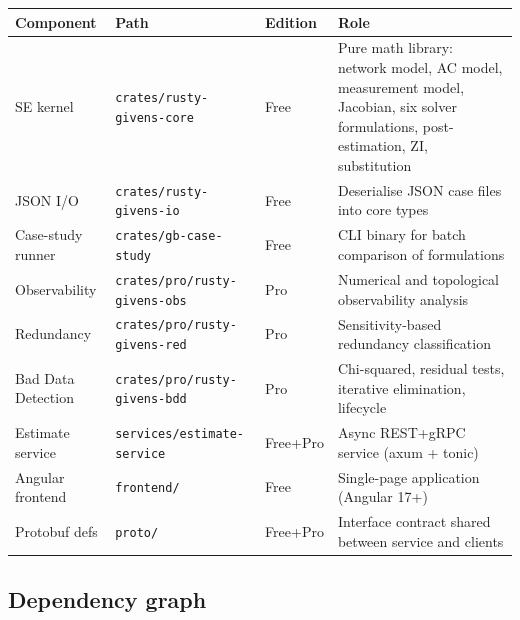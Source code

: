 \documentclass[11pt,a4paper]{article}
\begin{document}
\begin{center}
\small
\begin{tabular}{lllp{48mm}}
  \toprule
  \textbf{Component} & \textbf{Path} & \textbf{Edition} & \textbf{Role} \\
  \midrule
  SE kernel          & \texttt{crates/rusty-givens-core} & Free
    & Pure math library: network model, AC model, measurement model,
      Jacobian, six solver formulations, post-estimation, ZI, substitution \\
  JSON I/O           & \texttt{crates/rusty-givens-io}   & Free
    & Deserialise JSON case files into core types \\
  Case-study runner  & \texttt{crates/gb-case-study}     & Free
    & CLI binary for batch comparison of formulations \\
  Observability      & \texttt{crates/pro/rusty-givens-obs} & Pro
    & Numerical and topological observability analysis \\
  Redundancy         & \texttt{crates/pro/rusty-givens-red} & Pro
    & Sensitivity-based redundancy classification \\
  Bad Data Detection & \texttt{crates/pro/rusty-givens-bdd} & Pro
    & Chi-squared, residual tests, iterative elimination, lifecycle \\
  Estimate service   & \texttt{services/estimate-service} & Free+Pro
    & Async REST+gRPC service (axum + tonic) \\
  Angular frontend   & \texttt{frontend/}                 & Free
    & Single-page application (Angular 17+) \\
  Protobuf defs      & \texttt{proto/}                    & Free+Pro
    & Interface contract shared between service and clients \\
  \bottomrule
\end{tabular}
\end{center}

\subsection{Dependency graph}
\end{document}
